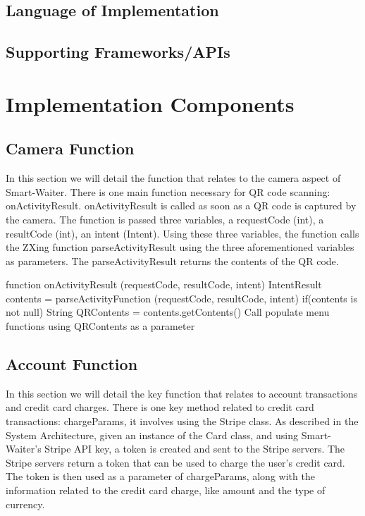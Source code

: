 \documentclass[12pt, titlepage]{article}
\begin{document}
\subsection{Language of Implementation}
\subsection{Supporting Frameworks/APIs}

\section{Implementation Components}

\subsection{Camera Function}
In this section we will detail the function that relates to the camera aspect of Smart-Waiter. There is one main function necessary for QR code scanning: onActivityResult. onActivityResult is called as soon as a QR code is captured by the camera. The function is passed three variables, a requestCode (int), a resultCode (int), an intent (Intent). Using these three variables, the function calls the ZXing function parseActivityResult using the three aforementioned variables as parameters. The parseActivityResult returns the contents of the QR code. 
 

function onActivityResult (requestCode, resultCode, intent)
	IntentResult contents = parseActivityFunction (requestCode, resultCode, intent)
	if(contents is not null)
		String QRContents = contents.getContents()
		Call populate menu functions using QRContents as a parameter
		
\subsection{Account Function}
In this section we will detail the key function that relates to account transactions and credit card charges. There is one key method related to credit card transactions: chargeParams, it involves using the Stripe class. As described in the System Architecture, given an instance of the Card class, and using Smart-Waiter's Stripe API key, a token is created and sent to the Stripe servers. The Stripe servers return a token that can be used to charge the user's credit card. The token is then used as a parameter of chargeParams, along with the information related to the credit card charge, like amount and the type of currency. 
\end{document}
